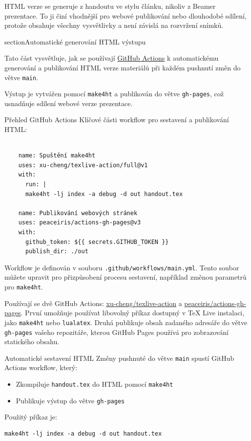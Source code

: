 HTML verze se generuje z handoutu ve stylu článku, nikoliv z Beamer prezentace.
To ji činí vhodnější pro webové publikování nebo dlouhodobé sdílení, protože
obsahuje všechny vysvětlivky a není závislá na rozvržení snímků.

section{Automatické generování HTML výstupu}

Tato část vysvětluje, jak se používají \href{https://docs.github.com/en/actions/writing-workflows/quickstart}{GitHub Actions} k automatickému generování a publikování HTML verze materiálů při každém pushnutí změn do větve \texttt{main}.

Výstup je vytvářen pomocí \texttt{make4ht} a publikován do větve \texttt{gh-pages}, což usnadňuje sdílení webové verze prezentace.

\begin{frame}[fragile]{Přehled GitHub Actions}
Klíčové části workflow pro sestavení a publikování HTML:

\begin{verbatim}

    name: Spuštění make4ht
    uses: xu-cheng/texlive-action/full@v1
    with:
      run: |
      make4ht -lj index -a debug -d out handout.tex

    name: Publikování webových stránek
    uses: peaceiris/actions-gh-pages@v3
    with:
      github_token: ${{ secrets.GITHUB_TOKEN }}
      publish_dir: ./out
\end{verbatim}

\end{frame}

Workflow je definován v souboru \texttt{.github/workflows/main.yml}.
Tento soubor můžete upravit pro přizpůsobení procesu sestavení, například změnou parametrů pro \texttt{make4ht}.

Používají se dvě GitHub Actions: \href{https://github.com/xu-cheng/texlive-action}{xu-cheng/texlive-action}
a \href{https://github.com/peaceiris/actions-gh-pages}{peaceiris/actions-gh-pages}.
První umožňuje používat libovolný příkaz dostupný v TeX Live instalaci, jako \texttt{make4ht} nebo \texttt{lualatex}.
Druhá publikuje obsah zadaného adresáře do větve \texttt{gh-pages} vašeho repozitáře,
kterou GitHub Pages používá pro zobrazování statického obsahu.

\begin{frame}[fragile]{Automatické sestavení HTML}
Změny pushnuté do větve \texttt{main} spustí GitHub Actions workflow, který:

\begin{itemize}
\item Zkompiluje \texttt{handout.tex} do HTML pomocí \texttt{make4ht}
\item Publikuje výstup do větve \texttt{gh-pages}
\end{itemize}

Použitý příkaz je:

\begin{verbatim}
make4ht -lj index -a debug -d out handout.tex
\end{verbatim}
\end{frame}

